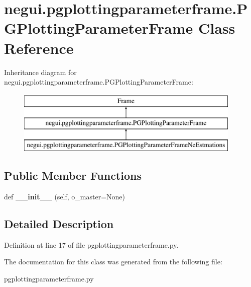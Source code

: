 \hypertarget{classnegui_1_1pgplottingparameterframe_1_1PGPlottingParameterFrame}{}\section{negui.\+pgplottingparameterframe.\+P\+G\+Plotting\+Parameter\+Frame Class Reference}
\label{classnegui_1_1pgplottingparameterframe_1_1PGPlottingParameterFrame}
Inheritance diagram for negui.\+pgplottingparameterframe.\+P\+G\+Plotting\+Parameter\+Frame\+:\begin{figure}[H]
\begin{center}
\leavevmode
\includegraphics[height=3.000000cm]{classnegui_1_1pgplottingparameterframe_1_1PGPlottingParameterFrame}
\end{center}
\end{figure}
\subsection*{Public Member Functions}
\begin{DoxyCompactItemize}
\item 
def {\bfseries \+\_\+\+\_\+init\+\_\+\+\_\+} (self, o\+\_\+master=None)\hypertarget{classnegui_1_1pgplottingparameterframe_1_1PGPlottingParameterFrame_ad3acf0468c20c950c28ff893f0cbf372}{}\label{classnegui_1_1pgplottingparameterframe_1_1PGPlottingParameterFrame_ad3acf0468c20c950c28ff893f0cbf372}

\end{DoxyCompactItemize}


\subsection{Detailed Description}


Definition at line 17 of file pgplottingparameterframe.\+py.



The documentation for this class was generated from the following file\+:\begin{DoxyCompactItemize}
\item 
pgplottingparameterframe.\+py\end{DoxyCompactItemize}
